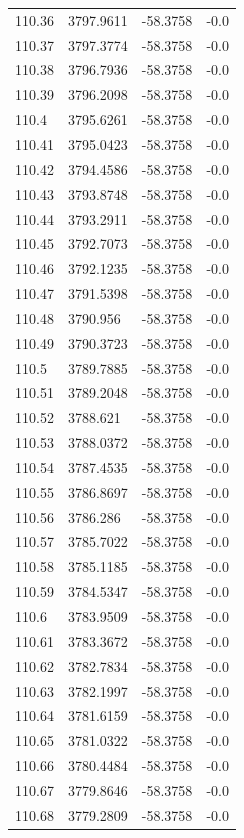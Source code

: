 \begin{table}[H]
\begin{tabular}{llll}
110.36 & 3797.9611 & -58.3758 & -0.0 \\
110.37 & 3797.3774 & -58.3758 & -0.0 \\
110.38 & 3796.7936 & -58.3758 & -0.0 \\
110.39 & 3796.2098 & -58.3758 & -0.0 \\
110.4 & 3795.6261 & -58.3758 & -0.0 \\
110.41 & 3795.0423 & -58.3758 & -0.0 \\
110.42 & 3794.4586 & -58.3758 & -0.0 \\
110.43 & 3793.8748 & -58.3758 & -0.0 \\
110.44 & 3793.2911 & -58.3758 & -0.0 \\
110.45 & 3792.7073 & -58.3758 & -0.0 \\
110.46 & 3792.1235 & -58.3758 & -0.0 \\
110.47 & 3791.5398 & -58.3758 & -0.0 \\
110.48 & 3790.956 & -58.3758 & -0.0 \\
110.49 & 3790.3723 & -58.3758 & -0.0 \\
110.5 & 3789.7885 & -58.3758 & -0.0 \\
110.51 & 3789.2048 & -58.3758 & -0.0 \\
110.52 & 3788.621 & -58.3758 & -0.0 \\
110.53 & 3788.0372 & -58.3758 & -0.0 \\
110.54 & 3787.4535 & -58.3758 & -0.0 \\
110.55 & 3786.8697 & -58.3758 & -0.0 \\
110.56 & 3786.286 & -58.3758 & -0.0 \\
110.57 & 3785.7022 & -58.3758 & -0.0 \\
110.58 & 3785.1185 & -58.3758 & -0.0 \\
110.59 & 3784.5347 & -58.3758 & -0.0 \\
110.6 & 3783.9509 & -58.3758 & -0.0 \\
110.61 & 3783.3672 & -58.3758 & -0.0 \\
110.62 & 3782.7834 & -58.3758 & -0.0 \\
110.63 & 3782.1997 & -58.3758 & -0.0 \\
110.64 & 3781.6159 & -58.3758 & -0.0 \\
110.65 & 3781.0322 & -58.3758 & -0.0 \\
110.66 & 3780.4484 & -58.3758 & -0.0 \\
110.67 & 3779.8646 & -58.3758 & -0.0 \\
110.68 & 3779.2809 & -58.3758 & -0.0 \\

\end{tabular}
\end{table}
